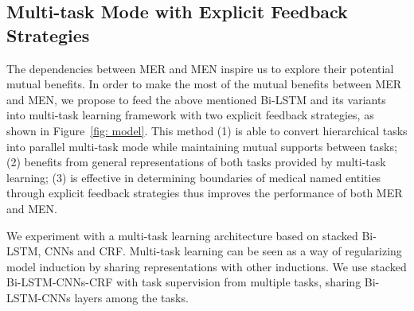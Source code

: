\subsection{Multi-task Mode with Explicit Feedback Strategies}
The dependencies between MER and MEN inspire us to explore their potential mutual benefits.
In order to make the most of the mutual benefits between MER and MEN, we propose to feed the above mentioned Bi-LSTM and its variants into multi-task learning framework with two explicit feedback strategies, as shown in Figure~\ref{fig: model}. This method (1) is able to convert hierarchical tasks into parallel multi-task mode while maintaining mutual supports between tasks; (2) benefits from general representations of both tasks provided by multi-task learning; (3) is effective in determining boundaries of medical named entities through explicit feedback strategies thus improves the performance of both MER and MEN.

We experiment with a multi-task learning architecture based on stacked Bi-LSTM, CNNs and CRF. Multi-task learning can be seen as a way of regularizing model induction by sharing representations with other inductions. We use stacked Bi-LSTM-CNNs-CRF with task supervision from multiple tasks, sharing Bi-LSTM-CNNs layers among the tasks.

